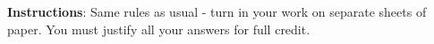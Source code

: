 \documentclass[10pt]{exam}
\begin{document}
\noindent \textbf{Instructions}: Same rules as usual - turn in your work on separate sheets of paper.  You must justify all your answers for full credit.

\begin{questions}

%		
%
%





\end{questions}
\end{document}
